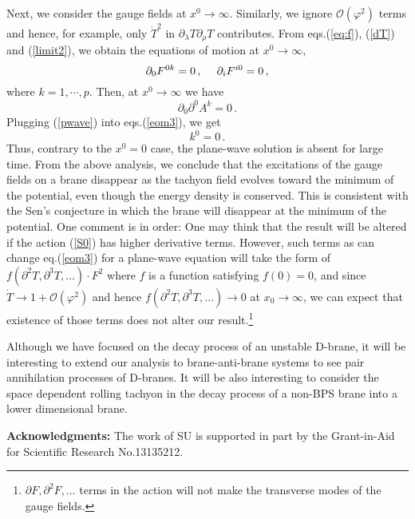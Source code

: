 \documentclass[12pt,a4paper]{article}
\newcommand{\p}{\partial}
\newcommand{\calO}{\mathcal{O}}
\begin{document}
Next, we consider the gauge fields at $x^0 \to \infty$.
Similarly, we ignore $\calO(\varphi^2)$ terms and hence, for
example, only $\dot{T}^2$ in $\p_\lambda T \p_\rho T$ contributes.
{}From eqs.(\ref{eq:f}), (\ref{dT}) and (\ref{limit2}), we obtain
the equations of motion at $x^0 \to \infty$,
\begin{equation}
  \p_0 F^{0 k}=0\,,\hspace{3ex} \p_i F^{i0}=0\,,
\end{equation}
where $k=1,\cdots ,p$.
Then, at $x^0 \to \infty$ we have
\begin{equation}
	\p_0 \p^0 A^k =0\,. \label{eom3}
\end{equation}
Plugging (\ref{pwave}) into eqs.(\ref{eom3}), we get
\begin{equation}
	k^0 =0\,.
\end{equation}
Thus, contrary to the $x^0=0$ case, the plane-wave solution is absent
for large time. From the above analysis, we conclude that the
excitations of the gauge fields on a brane disappear as the tachyon
field evolves toward the minimum of the potential, even though the
energy density is conserved. This is consistent with the Sen's
conjecture in which the brane will disappear at the minimum of the
potential. One comment is in order: One may think that the
result will be altered if the action (\ref{S0}) has higher derivative
terms. However, such terms as can change eq.(\ref{eom3}) for a
plane-wave equation will take the form of $f(\p^2 T,\p^3 T,\dots)\cdot
F^2$ where $f$ is a function satisfying $f(0)=0$, and since $\dot T\to
1 +\calO(\varphi^2)$ and hence $f(\p^2 T,\p^3 T,\dots)\to 0$ at
$x_0\to\infty$, we can expect that existence of those terms does not
alter our result.\footnote{$\p F,\p^2 F,\dots$ terms in the action
will not make the transverse modes of the gauge fields.}

Although we have focused on the decay process of an unstable D-brane,
it will be interesting to extend our analysis to brane-anti-brane
systems to see pair annihilation processes of D-branes.
It will be also interesting to consider the space dependent rolling
tachyon in the decay process of a non-BPS brane into a lower
dimensional brane.

\vspace{5mm}
{\bf Acknowledgments:}
The work of SU is supported in part by the Grant-in-Aid for Scientific
Research No.13135212.
\end{document}
